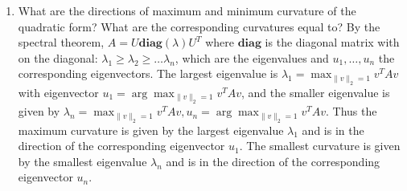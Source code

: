 \documentclass[12pt,twoside]{article}
\begin{document}
\begin{enumerate}
\begin{enumerate}
\item What are the directions of maximum and minimum curvature of the quadratic form? What are the corresponding curvatures equal to?
By the spectral theorem, $A = U \textbf{diag}(\lambda) U^T$ where $\textbf{diag}$ is the diagonal matrix with on the diagonal: $\lambda_1 \ge \lambda_2 \ge \ldots \lambda_n$, which are the eigenvalues and $u_1, \dots, u_n$ the corresponding eigenvectors. The largest eigenvalue is
$\lambda_1 = \max_{\|v\|_2 =1} v^T A v$ with eigenvector $u_1 = \arg \max_{\|v\|_2 =1} v^T A v$, and the smaller eigenvalue  is given by $\lambda_n = \max_{\|v\|_2 =1} v^T A v, u_n = \arg \max_{\|v\|_2 =1} v^T A v$. Thus the maximum curvature is given by the largest eigenvalue $\lambda_1$ and  is in the direction of the corresponding eigenvector $u_1$. 
	The smallest curvature is  given  by  the  smallest  eigenvalue $\lambda_n$ and is in the direction of the corresponding eigenvector $u_n$.

\end{enumerate}


\end{enumerate}
\end{document}
